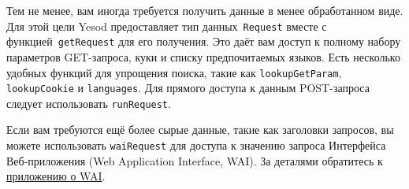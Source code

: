 Тем не менее, вам иногда требуется получить данные в менее обработанном виде. Для этой
цели Yesod предоставляет тип данных~\lstinline!Request!  вместе с
функцией~\lstinline!getRequest! для его получения. Это даёт вам доступ к полному набору
параметров GET-запроса, куки и списку предпочитаемых языков. Есть несколько удобных
функций для упрощения поиска, такие как \lstinline!lookupGetParam!,
\lstinline!lookupCookie!  и \lstinline!languages!. Для прямого доступа к данным
POST-запроса следует использовать \lstinline!runRequest!.

Если вам требуются ещё более сырые данные, такие как заголовки
запросов, вы можете использовать \lstinline!waiRequest! для доступа к
значению запроса Интерфейса Веб-приложения (Web Application Interface,
WAI). За деталями обратитесь к \hyperref[chap:web_application_interface]{приложению о WAI}.

